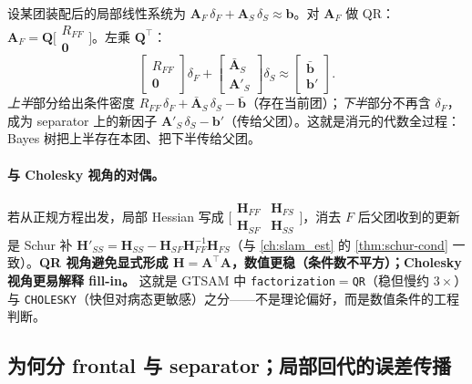 设某团装配后的局部线性系统为 $\mathbf{A}_F\,\delta_F+\mathbf{A}_S\,\delta_S\approx\mathbf{b}$。对 $\mathbf{A}_F$ 做 QR：$\mathbf{A}_F=\mathbf{Q}\big[\begin{smallmatrix}R_{FF}\\\mathbf{0}\end{smallmatrix}\big]$。左乘 $\mathbf{Q}^\top$：
\begin{equation}
  \begin{bmatrix}R_{FF}\\\mathbf{0}\end{bmatrix}\delta_F
  +\begin{bmatrix}\bar{\mathbf{A}}_S\\\mathbf{A}'_S\end{bmatrix}\delta_S
  \approx\begin{bmatrix}\bar{\mathbf{b}}\\\mathbf{b}'\end{bmatrix}.
  \label{eq:clique-qr}
\end{equation}
\emph{上半}部分给出条件密度 $R_{FF}\,\delta_F+\bar{\mathbf{A}}_S\,\delta_S-\bar{\mathbf{b}}$（存在当前团）；\emph{下半}部分不再含 $\delta_F$，成为 separator 上的新因子 $\mathbf{A}'_S\,\delta_S-\mathbf{b}'$（传给父团）。这就是消元的代数全过程：Bayes 树把上半存在本团、把下半传给父团。

\paragraph{与 Cholesky 视角的对偶。}
若从正规方程出发，局部 Hessian 写成 $\big[\begin{smallmatrix}\mathbf{H}_{FF}&\mathbf{H}_{FS}\\\mathbf{H}_{SF}&\mathbf{H}_{SS}\end{smallmatrix}\big]$，消去 $F$ 后父团收到的更新是 Schur 补 $\mathbf{H}'_{SS}=\mathbf{H}_{SS}-\mathbf{H}_{SF}\mathbf{H}_{FF}^{-1}\mathbf{H}_{FS}$（与 \cref{ch:slam_est} 的 \cref{thm:schur-cond} 一致）。\textbf{QR 视角避免显式形成 $\mathbf{H}=\mathbf{A}^\top\mathbf{A}$，数值更稳（条件数不平方）；Cholesky 视角更易解释 fill-in。} 这就是 GTSAM 中 \texttt{factorization}$=$\texttt{QR}（稳但慢约 $3\times$）与 \texttt{CHOLESKY}（快但对病态更敏感）之分——不是理论偏好，而是数值条件的工程判断。

\subsection{为何分 frontal 与 separator；局部回代的误差传播}
\label{sec:isam-fs-split}

